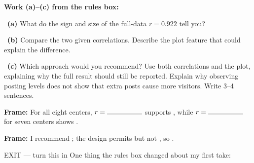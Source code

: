 \documentclass[11pt]{article}
\begin{document}
\newpage
\textbf{Work (a)--(c) from the rules box:}\par\smallskip

~\textbf{(a)} What do the sign and size of the full-data $r=0.922$ tell you?\par
\workspace{0.55in}

~\textbf{(b)} Compare the two given correlations. Describe the plot feature that could explain the difference.\par
\workspace{1.1in}

~\textbf{(c)} Which approach would you recommend? Use both correlations and the plot, explaining why the full result should still be reported. Explain why observing posting levels does not show that extra posts cause more visitors. Write 3--4 sentences.\par
\workspace{1.7in}

\begin{sentenceframebox}\raggedright\textbf{Frame:} For all eight centers, $r=\blank[0.7in]$ supports \blank[1.8in], while $r=\blank[0.7in]$ for seven centers shows \blank[1.8in].\end{sentenceframebox}

\begin{sentenceframebox}\raggedright\textbf{Frame:} I recommend \blank[0.8in]; the design permits \blank[1.6in] but not \blank[1.6in], so \blank[1.8in].\end{sentenceframebox}

\begin{summaryexitbox}{EXIT --- turn this in}
One thing the rules box changed about my first take: \hrulefill\par
\workspace{0.4in}
\end{summaryexitbox}
\end{document}
